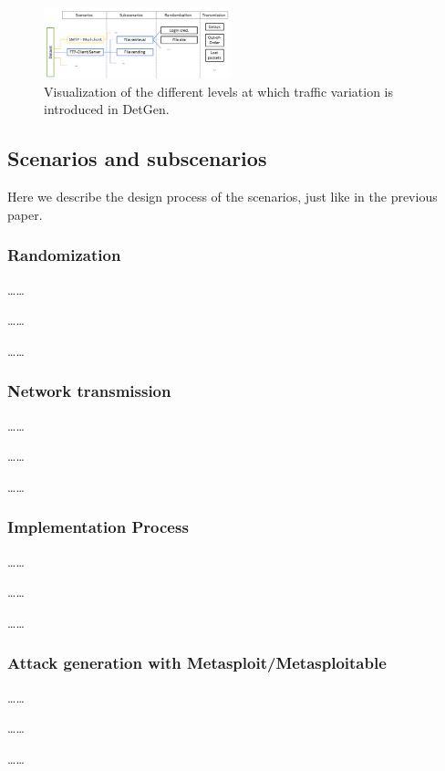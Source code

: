 \documentclass[sigconf]{acmart}
\begin{document}
\begin{figure}
 \centering 
 \includegraphics[width=0.480\textwidth]{images/scenario_branching.PNG}
 \caption{Visualization of the different levels at which traffic variation is introduced in DetGen.}
 \label{Fig:branching}
\end{figure}


\subsection{Scenarios and subscenarios}
\label{Sec:Scenarios}
Here we describe the design process of the scenarios, just like in the previous paper.

\subsubsection{Randomization}\label{Sec:randomsubscen}
\dots \dots

\dots \dots

\dots \dots
\subsubsection{Network transmission}\label{Sec:Netrand}
\dots \dots

\dots \dots

\dots \dots

\subsubsection{Implementation Process}
\dots \dots

\dots \dots

\dots \dots

\subsubsection{Attack generation with Metasploit/Metasploitable}
\dots \dots

\dots \dots

\dots \dots
 
\end{document}
